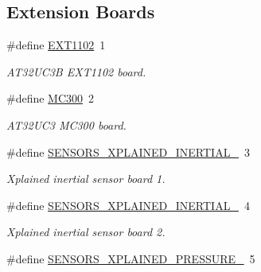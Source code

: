 \subsection*{Extension Boards}
\begin{DoxyCompactItemize}
\item 
\hypertarget{group__group__common__boards_gac0e7416ec00004a707cf2d27ad58cb3d}{}\#define \hyperlink{group__group__common__boards_gac0e7416ec00004a707cf2d27ad58cb3d}{E\+X\+T1102}~1\label{group__group__common__boards_gac0e7416ec00004a707cf2d27ad58cb3d}

\begin{DoxyCompactList}\small\item\em A\+T32\+U\+C3\+B E\+X\+T1102 board. \end{DoxyCompactList}\item 
\hypertarget{group__group__common__boards_gace61944bcb2fb68401c2706a769fd03e}{}\#define \hyperlink{group__group__common__boards_gace61944bcb2fb68401c2706a769fd03e}{M\+C300}~2\label{group__group__common__boards_gace61944bcb2fb68401c2706a769fd03e}

\begin{DoxyCompactList}\small\item\em A\+T32\+U\+C3 M\+C300 board. \end{DoxyCompactList}\item 
\hypertarget{group__group__common__boards_gab00de293d88d2d5b7abbd20fabf3640b}{}\#define \hyperlink{group__group__common__boards_gab00de293d88d2d5b7abbd20fabf3640b}{S\+E\+N\+S\+O\+R\+S\+\_\+\+X\+P\+L\+A\+I\+N\+E\+D\+\_\+\+I\+N\+E\+R\+T\+I\+A\+L\+\_}~3\label{group__group__common__boards_gab00de293d88d2d5b7abbd20fabf3640b}

\begin{DoxyCompactList}\small\item\em Xplained inertial sensor board 1. \end{DoxyCompactList}\item 
\hypertarget{group__group__common__boards_gaa9549edc14a78c1600acf49e44b9c5ac}{}\#define \hyperlink{group__group__common__boards_gaa9549edc14a78c1600acf49e44b9c5ac}{S\+E\+N\+S\+O\+R\+S\+\_\+\+X\+P\+L\+A\+I\+N\+E\+D\+\_\+\+I\+N\+E\+R\+T\+I\+A\+L\+\_}~4\label{group__group__common__boards_gaa9549edc14a78c1600acf49e44b9c5ac}

\begin{DoxyCompactList}\small\item\em Xplained inertial sensor board 2. \end{DoxyCompactList}\item 
\hypertarget{group__group__common__boards_ga6d24ad0b78a00ebea03fc2b263e0735b}{}\#define \hyperlink{group__group__common__boards_ga6d24ad0b78a00ebea03fc2b263e0735b}{S\+E\+N\+S\+O\+R\+S\+\_\+\+X\+P\+L\+A\+I\+N\+E\+D\+\_\+\+P\+R\+E\+S\+S\+U\+R\+E\+\_}~5\label{group__group__common__boards_ga6d24ad0b78a00ebea03fc2b263e0735b}


\end{DoxyCompactItemize}
